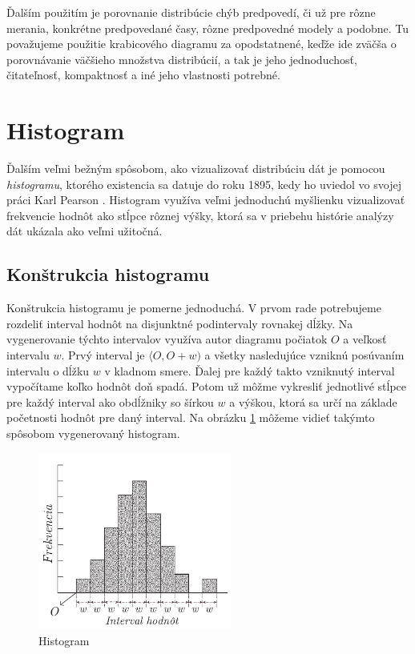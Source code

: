 Ďalším použitím je porovnanie distribúcie chýb predpovedí, či už pre rôzne merania, konkrétne predpovedané časy, rôzne predpovedné modely a podobne. Tu považujeme použitie krabicového diagramu za opodstatnené, keďže ide zväčša o porovnávanie väčšieho množstva distribúcií, a tak je jeho jednoduchosť, čitateľnosť, kompaktnosť a iné jeho vlastnosti potrebné.

\section{Histogram}
Ďalším veľmi bežným spôsobom, ako vizualizovať distribúciu dát je pomocou \textit{histogramu}, ktorého existencia sa datuje do roku 1895, kedy ho uviedol vo svojej práci Karl Pearson \cite{histogram}. Histogram využíva veľmi jednoduchú myšlienku vizualizovať frekvencie hodnôt ako stĺpce rôznej výšky, ktorá sa v priebehu histórie analýzy dát ukázala ako veľmi užitočná.

\subsection{Konštrukcia histogramu}
Konštrukcia histogramu je pomerne jednoduchá. V prvom rade potrebujeme rozdeliť interval hodnôt na disjunktné podintervaly rovnakej dĺžky. Na vygenerovanie týchto intervalov využíva autor diagramu počiatok $ O $ a veľkosť intervalu $ w $. Prvý interval je $ \langle O, O + w) $ a všetky nasledujúce vzniknú posúvaním intervalu o dĺžku $ w $ v kladnom smere. Ďalej pre každý takto vzniknutý interval vypočítame koľko hodnôt doň spadá. Potom už môžme vykresliť jednotlivé stĺpce pre každý interval ako obdĺžniky so šírkou $ w $ a výškou, ktorá sa určí na základe početnosti hodnôt pre daný interval. Na obrázku \ref{fig:histogram} môžeme vidieť takýmto spôsobom vygenerovaný histogram.

\begin{figure}
	\centering
	\includegraphics[width = 2.5in]{histogram}
	\caption{ Histogram }
	\label{fig:histogram}
\end{figure}

